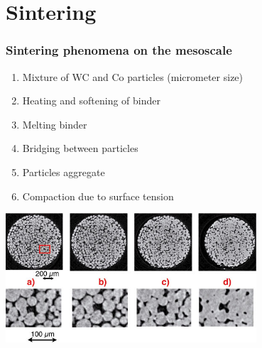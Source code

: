 \documentclass[11pt,mathserif]{beamer}
\begin{document}
\section{Sintering}
\begin{frame}
 \frametitle{Sintering phenomena on the mesoscale}


 \begin{enumerate}
  \item Mixture of WC and Co particles (micrometer size)
  \item Heating and softening of binder
  \item Melting binder
  \item Bridging between particles
  \item Particles aggregate
  \item Compaction due to surface tension
 \end{enumerate}
\begin{center}
 \includegraphics[width=0.7\textwidth]{figures/fig081.jpeg}
\end{center}
\end{frame}
\end{document}
